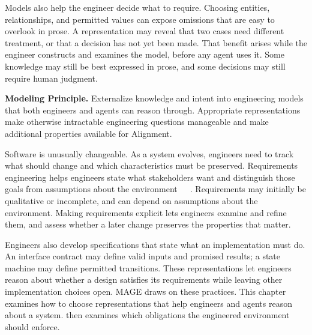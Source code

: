 
Models also help the engineer decide what to require. Choosing entities, relationships, and permitted values can expose omissions that are easy to overlook in prose. A representation may reveal that two cases need different treatment, or that a decision has not yet been made. That benefit arises while the engineer constructs and examines the model, before any agent uses it. Some knowledge may still be best expressed in prose, and some decisions may still require human judgment.



\textbf{Modeling Principle.} Externalize knowledge and intent into engineering models that both engineers and agents can reason through. Appropriate representations make otherwise intractable engineering questions manageable and make additional properties available for Alignment.

Software is unusually changeable. As a system evolves, engineers need to track what should change and which characteristics must be preserved. Requirements engineering helps engineers state what stakeholders want and distinguish those goals from assumptions about the environment~\citep{zave1997darkcorners}~\citep{nuseibeh2000roadmap}~\citep{vanlamsweerde2009re}. Requirements may initially be qualitative or incomplete, and can depend on assumptions about the environment. Making requirements explicit lets engineers examine and refine them, and assess whether a later change preserves the properties that matter.

Engineers also develop specifications that state what an implementation must do. An interface contract may define valid inputs and promised results; a state machine may define permitted transitions. These representations let engineers reason about whether a design satisfies its requirements while leaving other implementation choices open. MAGE draws on these practices. This chapter examines how to choose representations that help engineers and agents reason about a system.  then examines which obligations the engineered environment should enforce.

